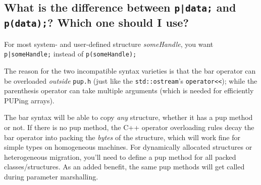 \subsection{What is the difference between {\tt p|data;} and
{\tt p(data);}? Which one should I use?}

For most system- and user-defined structure {\em someHandle}, you want
{\tt p|someHandle;} instead of {\tt p(someHandle);}

The reason for the two incompatible syntax varieties is that the bar
operator can be overloaded {\em outside} {\tt pup.h} (just like the
{\tt std::ostream}'s {\tt operator{<}<});
while the parenthesis operator can take multiple arguments (which is needed
for efficiently PUPing arrays).

The bar syntax will be able to copy {\em any} structure, whether it
has a pup method or not. If there is no pup method, the C++ operator overloading
rules decay the bar operator into packing the {\em bytes} of the structure,
which will work fine for simple types on homogeneous machines. For dynamically
allocated structures or heterogeneous migration, you'll need to define
a pup method for all packed classes/structures. As an added benefit, the
same pup methods will get called during parameter marshalling.
